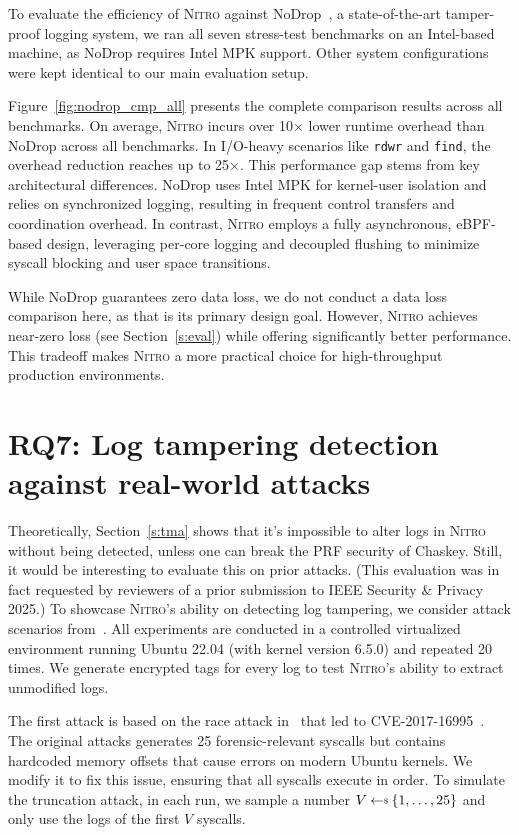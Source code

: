 \documentclass[sigconf]{sty/acmart}
\newcommand{\Sys}{\mbox{\textsc{Nitro}}\xspace}
\newcommand{\nodrop}{NoDrop\xspace}
\newcommand{\heading}[1]{\vspace{6pt}\noindent{\underline{\textsc{#1}}}}
\newcommand{\secref}[1]{Section~\ref{#1}}
\newcommand{\getsr}{{\:{\leftarrow{\hspace*{-3pt}\raisebox{.75pt}{$\scriptscriptstyle\$$}}}\:}}
\newcommand{\Syss}{{\textsc{Nitro}}'s }
\begin{document}
\begin{appendix}
To evaluate the efficiency of \Sys against \nodrop~\cite{nodrop}, a state-of-the-art tamper-proof logging system, we ran all seven stress-test benchmarks on an Intel-based machine, as \nodrop requires Intel MPK support. Other system configurations were kept identical to our main evaluation setup.

Figure~\ref{fig:nodrop_cmp_all} presents the complete comparison results across all benchmarks. On average, \Sys incurs over 10× lower runtime overhead than \nodrop across all benchmarks. In I/O-heavy scenarios like \texttt{rdwr} and \texttt{find}, the overhead reduction reaches up to 25×.
This performance gap stems from key architectural differences. \nodrop uses Intel MPK for kernel-user isolation and relies on synchronized logging, resulting in frequent control transfers and coordination overhead. In contrast, \Sys employs a fully asynchronous, eBPF-based design, leveraging per-core logging and decoupled flushing to minimize syscall blocking and user space transitions.

While \nodrop guarantees zero data loss, we do not conduct a data loss comparison here, as that is its primary design goal. However, \Sys achieves near-zero loss (see Section~\ref{s:eval}) while offering significantly better performance. This tradeoff makes \Sys a more practical choice for high-throughput production environments.

\section{RQ7: Log tampering detection against real-world attacks} \label{app:real-world-attacks}

Theoretically, \secref{s:tma} shows that it's impossible to alter logs in \Sys without being detected, unless one can break the PRF security of Chaskey. 
Still,  it would be interesting to evaluate this on prior attacks. 
(This evaluation was in fact requested by reviewers of a prior submission to IEEE Security \& Privacy 2025.)
To showcase \Syss ability on detecting log tampering, we consider attack scenarios from~\cite{kennylog,custos}. 
All experiments are conducted in a controlled virtualized environment running Ubuntu 22.04 (with kernel version 6.5.0) and repeated 20 times.
We generate encrypted tags for every log to test \Syss ability to extract unmodified logs. 


\heading{The attacks.} The first attack is based on the race attack in~\cite{kennylog} that led to CVE-2017-16995~\cite{cve_16995}. 
The original attacks generates 25 forensic-relevant syscalls but contains hardcoded memory offsets that cause errors on modern Ubuntu kernels. We modify it to fix this issue, ensuring that all syscalls execute in order.
To simulate the truncation attack, in each run, we sample a number $V \getsr \{1, \ldots, 25\}$ and only use the logs of the first $V$ syscalls. 


\end{appendix}
\end{document}
